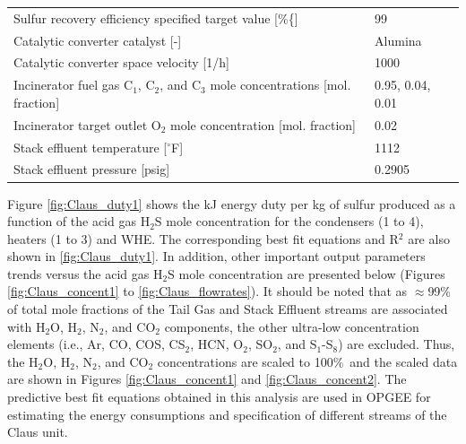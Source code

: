 \documentclass[11pt]{report}
\begin{document}
\begin{table}
\begin{scriptsize}
\begin{tabular*}{1\columnwidth}{p{}p{}}
Sulfur recovery efficiency specified target value {[}\%\{]}            &    99\\
Catalytic converter catalyst {[}-{]}                 &              Alumina \\
Catalytic converter space velocity {[}1/h{]}                     &      1000    \\
Incinerator fuel gas C$_1$, C$_2$, and C$_3$ mole concentrations {[}mol. fraction{]}         &        0.95, 0.04, 0.01    \\
Incinerator target outlet O$_2$ mole concentration {[}mol. fraction{]}                 &      0.02    \\
Stack effluent temperature {[}$^\circ$F{]}                &       1112    \\
Stack effluent pressure {[}psig{]}                        &        0.2905     \\
\bottomrule
\end{tabular*}
\end{scriptsize}
\end{table}

Figure \ref{fig:Claus_duty1} shows the kJ energy duty per kg of sulfur produced as a function of the acid gas H$_2$S mole concentration for the condensers (1 to 4), heaters (1 to 3) and WHE. The corresponding best fit equations and R$^2$ are also shown in \ref{fig:Claus_duty1}. In addition, other important output parameters trends versus the acid gas H$_2$S mole concentration are presented below (Figures \ref{fig:Claus_concent1} to \ref{fig:Claus_flowrates}). It should be noted that as $\approx$99\% of total mole fractions of the Tail Gas and Stack Effluent streams are associated with H$_2$O, H$_2$, N$_2$, and CO$_2$ components, the other ultra-low concentration elements (i.e., Ar, CO, COS, CS$_2$, HCN, O$_2$, SO$_2$, and S$_1$-S$_8$) are excluded. Thus, the H$_2$O, H$_2$, N$_2$, and CO$_2$ concentrations are scaled to 100\%\, and the scaled data are shown in Figures \ref{fig:Claus_concent1} and \ref{fig:Claus_concent2}. The predictive best fit equations obtained in this analysis are used in OPGEE for estimating the energy consumptions and specification of different streams of the Claus unit.         
\end{document}

